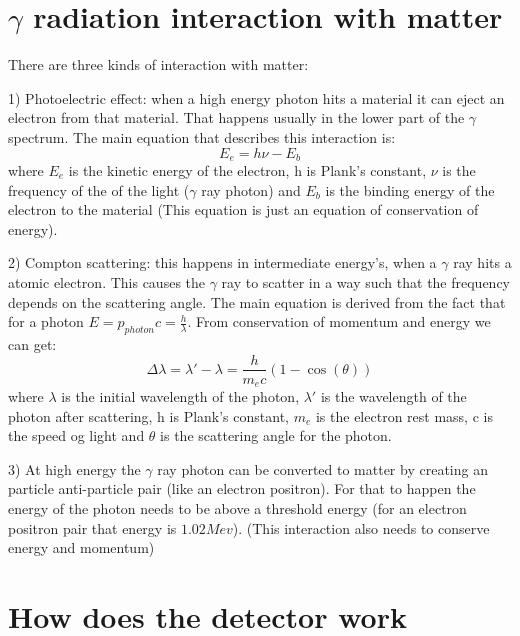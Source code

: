\documentclass[]{article}
\begin{document}
\section{$\gamma$ radiation interaction with matter}

There are three kinds of interaction with matter:

1) Photoelectric effect: when a high energy photon hits a material it can eject an electron from that material. That happens usually in the lower part of the $\gamma$ spectrum. The main equation that describes this interaction is: $$E_e=h\nu-E_b$$ where $E_e$ is the kinetic energy of the electron, h is Plank's constant, $\nu$ is the frequency of the of the light ($\gamma$ ray photon) and $E_b$ is the binding energy of the electron to the material (This equation is just an equation of conservation of energy).

2) Compton scattering: this happens in intermediate energy's, when a $\gamma$ ray hits a atomic electron. This causes the $\gamma$ ray to scatter in a way such that the frequency depends on the scattering angle. The main equation is derived from the fact that for a photon $E=p_{photon}c=\frac{h}{\lambda}$. From conservation of momentum and energy we can get: $$\Delta \lambda =\lambda '-\lambda=\frac{h}{m_ec}(1-\cos(\theta))$$ where $\lambda$ is the initial wavelength of the photon, $\lambda'$ is the wavelength of the photon after scattering, h is Plank's constant, $m_e$ is the electron rest mass, c is the speed og light and $\theta$ is the scattering angle for the photon.

3) At high energy the $\gamma$ ray photon can be converted to matter by creating an particle anti-particle pair (like an electron positron). For that to happen the energy of the photon needs to be above a threshold energy (for an electron positron pair that energy is $1.02Mev$). (This interaction also needs to conserve energy and momentum)

\section{How does the detector work}
\end{document}
